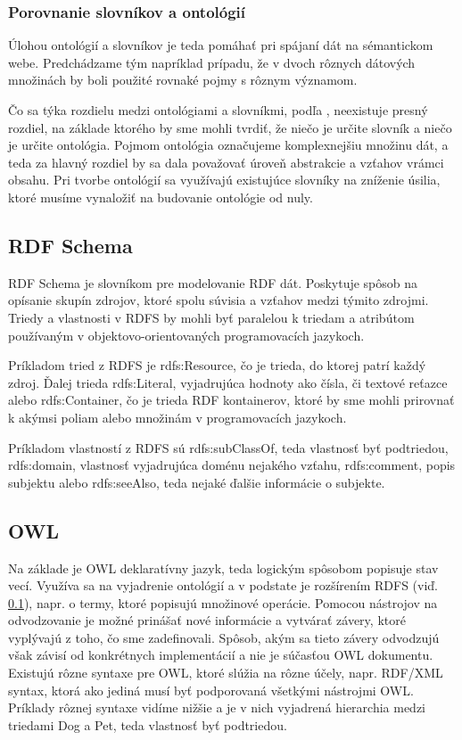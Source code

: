 \subsubsection{Porovnanie slovníkov a ontológií}
Úlohou ontológií a slovníkov je teda pomáhať pri spájaní dát na sémantickom webe. Predchádzame tým napríklad prípadu, že
v dvoch rôznych dátových množinách by boli použité rovnaké pojmy s rôznym významom. 

Čo sa týka rozdielu medzi ontológiami a slovníkmi, podľa \cite{vocabularies}, neexistuje presný
rozdiel, na základe ktorého by sme mohli tvrdiť, že niečo je určite slovník a niečo je určite
ontológia. Pojmom ontológia označujeme komplexnejšiu množinu dát, a teda za hlavný
rozdiel by sa dala považovať úroveň abstrakcie a vzťahov vrámci obsahu. Pri tvorbe
ontológií sa využívajú existujúce slovníky na zníženie úsilia, ktoré musíme vynaložiť na
budovanie ontológie od nuly.

\subsection{RDF Schema} \label{secSchema}
RDF Schema \cite{schema} je slovníkom pre modelovanie RDF dát. Poskytuje spôsob na opísanie skupín zdrojov, ktoré spolu súvisia a vzťahov medzi týmito zdrojmi. 
Triedy a vlastnosti v RDFS by mohli byť paralelou k triedam a atribútom používaným v objektovo-orientovaných
programovacích jazykoch. 

Príkladom tried z RDFS je rdfs:Resource, čo je trieda, do ktorej patrí každý zdroj. Ďalej trieda rdfs:Literal, vyjadrujúca hodnoty ako čísla, či textové reťazce alebo rdfs:Container, čo je trieda RDF kontainerov, ktoré by sme mohli prirovnať k akýmsi poliam alebo množinám v programovacích jazykoch.

Príkladom vlastností z RDFS sú  rdfs:subClassOf, teda vlastnosť byť podtriedou, rdfs:domain, vlastnosť vyjadrujúca doménu nejakého vzťahu,
rdfs:comment, popis subjektu alebo rdfs:seeAlso, teda nejaké ďalšie informácie o subjekte.

\subsection{OWL} \label{secOwl}
Na základe \cite{owl} je OWL deklaratívny jazyk, teda logickým spôsobom popisuje stav vecí.
Využíva sa na vyjadrenie ontológií a v podstate je rozšírením RDFS (viď. \ref{secSchema}), napr. o termy,
ktoré popisujú množinové operácie. Pomocou nástrojov na odvodzovanie je možné prinášať nové informácie a vytvárať závery, ktoré vyplývajú z toho, čo sme zadefinovali.
Spôsob, akým sa tieto závery odvodzujú však závisí od konkrétnych implementácií a nie
je súčasťou OWL dokumentu. Existujú rôzne syntaxe pre OWL, ktoré slúžia na rôzne
účely, napr. RDF/XML syntax, ktorá ako jediná musí byť podporovaná všetkými nástrojmi OWL. Príklady rôznej syntaxe vidíme nižšie a je v nich vyjadrená hierarchia
medzi triedami Dog a Pet, teda vlastnosť byť podtriedou. 

